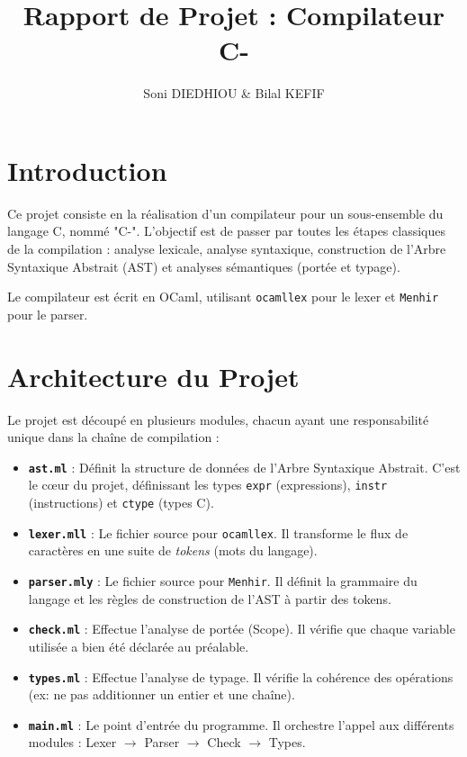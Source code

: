 \documentclass[a4paper,11pt]{article}
\title{Rapport de Projet : Compilateur C-}
\author{Soni DIEDHIOU \& Bilal KEFIF}
\begin{document}
\maketitle
\tableofcontents
\newpage

\section{Introduction}
Ce projet consiste en la réalisation d'un compilateur pour un sous-ensemble du langage C, nommé "C-". L'objectif est de passer par toutes les étapes classiques de la compilation : analyse lexicale, analyse syntaxique, construction de l'Arbre Syntaxique Abstrait (AST) et analyses sémantiques (portée et typage).

Le compilateur est écrit en OCaml, utilisant \texttt{ocamllex} pour le lexer et \texttt{Menhir} pour le parser.

\section{Architecture du Projet}
Le projet est découpé en plusieurs modules, chacun ayant une responsabilité unique dans la chaîne de compilation :

\begin{itemize}
    \item \textbf{\texttt{ast.ml}} : Définit la structure de données de l'Arbre Syntaxique Abstrait. C'est le cœur du projet, définissant les types \texttt{expr} (expressions), \texttt{instr} (instructions) et \texttt{ctype} (types C).
    \item \textbf{\texttt{lexer.mll}} : Le fichier source pour \texttt{ocamllex}. Il transforme le flux de caractères en une suite de \textit{tokens} (mots du langage).
    \item \textbf{\texttt{parser.mly}} : Le fichier source pour \texttt{Menhir}. Il définit la grammaire du langage et les règles de construction de l'AST à partir des tokens.
    \item \textbf{\texttt{check.ml}} : Effectue l'analyse de portée (Scope). Il vérifie que chaque variable utilisée a bien été déclarée au préalable.
    \item \textbf{\texttt{types.ml}} : Effectue l'analyse de typage. Il vérifie la cohérence des opérations (ex: ne pas additionner un entier et une chaîne).
    \item \textbf{\texttt{main.ml}} : Le point d'entrée du programme. Il orchestre l'appel aux différents modules : Lexer $\rightarrow$ Parser $\rightarrow$ Check $\rightarrow$ Types.
\end{itemize}
\end{document}
